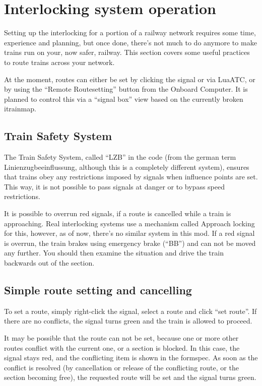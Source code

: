 \documentclass[english]{paper}
\begin{document}
\section{Interlocking system operation}

Setting up the interlocking for a portion of a railway network requires
some time, experience and planning, but once done, there's not much
to do anymore to make trains run on your, now safer, railway. This
section covers some useful practices to route trains across your network.

At the moment, routes can either be set by clicking the signal or
via LuaATC, or by using the ``Remote Routesetting'' button from
the Onboard Computer. It is planned to control this via a ``signal
box'' view based on the currently broken itrainmap.

\subsection{Train Safety System}

The Train Safety System, called ``LZB'' in the code (from the german
term Linienzugbeeinflussung, although this is a completely different
system), ensures that trains obey any restrictions imposed by signals
when influence points are set. This way, it is not possible to pass
signals at danger or to bypass speed restrictions.

It is possible to overrun red signals, if a route is cancelled while
a train is approaching. Real interlocking systems use a mechanism
called Approach locking for this, however, as of now, there's no similar
system in this mod. If a red signal is overrun, the train brakes using
emergency brake (``BB'') and can not be moved any further. You should
then examine the situation and drive the train backwards out of the
section.

\subsection{Simple route setting and cancelling}

To set a route, simply right-click the signal, select a route and
click ``set route''. If there are no conflicts, the signal turns
green and the train is allowed to proceed.

It may be possible that the route can not be set, because one or more
other routes conflict with the current one, or a section is blocked.
In this case, the signal stays red, and the conflicting item is shown
in the formspec. As soon as the conflict is resolved (by cancellation
or release of the conflicting route, or the section becoming free),
the requested route will be set and the signal turns green.
\end{document}
